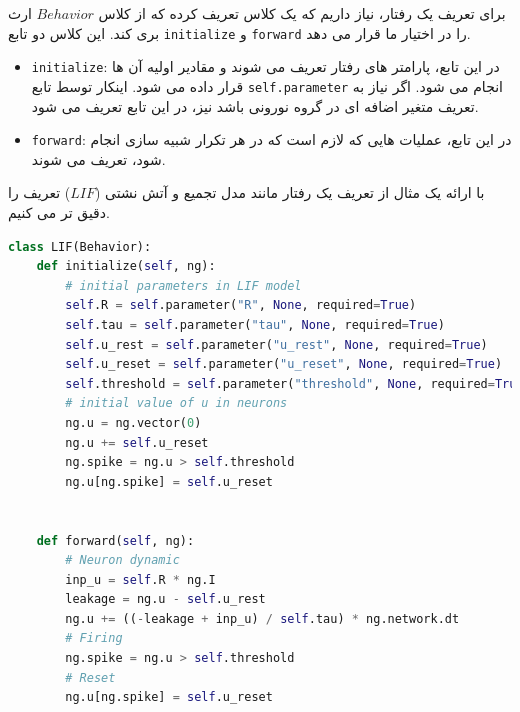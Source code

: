 \documentclass{article}
\begin{document}
            برای تعریف یک رفتار، نیاز داریم که یک کلاس تعریف کرده که از کلاس 
            $Behavior$ 
            ارث بری کند.
            این کلاس دو تابع 
            \texttt{initialize} و
            \texttt{forward} 
            را در اختیار ما قرار می دهد.
            \begin{itemize}
                \item \texttt{initialize}:
                در این تابع، پارامتر های رفتار تعریف می شوند و مقادیر اولیه آن ها قرار داده می شود. اینکار توسط تابع 
                \texttt{self.parameter} 
                انجام می شود. اگر نیاز به تعریف متغیر اضافه ای در گروه نورونی باشد نیز، در این تابع تعریف می شود.
                \item \texttt{forward}:
                در این تابع، عملیات هایی که لازم است که در هر تکرار شبیه سازی انجام شود، تعریف می شوند.
            \end{itemize}
            با ارائه یک مثال از تعریف یک رفتار مانند مدل تجمیع و آتش نشتی
            ($LIF$) 
            تعریف را دقیق تر می کنیم.
        \begin{latin}        
            \centering        
                \begin{lstlisting}[language=Python]
class LIF(Behavior):
    def initialize(self, ng):
        # initial parameters in LIF model
        self.R = self.parameter("R", None, required=True)
        self.tau = self.parameter("tau", None, required=True)
        self.u_rest = self.parameter("u_rest", None, required=True)
        self.u_reset = self.parameter("u_reset", None, required=True)
        self.threshold = self.parameter("threshold", None, required=True)
        # initial value of u in neurons
        ng.u = ng.vector(0) 
        ng.u += self.u_reset
        ng.spike = ng.u > self.threshold
        ng.u[ng.spike] = self.u_reset


    def forward(self, ng):
        # Neuron dynamic
        inp_u = self.R * ng.I 
        leakage = ng.u - self.u_rest
        ng.u += ((-leakage + inp_u) / self.tau) * ng.network.dt
        # Firing
        ng.spike = ng.u > self.threshold
        # Reset
        ng.u[ng.spike] = self.u_reset
            \end{lstlisting}
        \end{latin}
            
\end{document}

